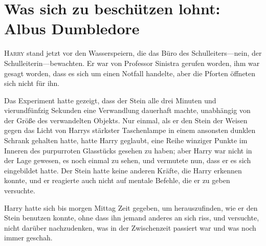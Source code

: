\chapter{Was sich zu beschützen lohnt: Albus Dumbledore}

\lettrine{H}{arry} stand jetzt vor den Wasserspeiern, die das Büro des Schulleiters—nein, der Schulleiterin—bewachten. Er war von Professor Sinistra gerufen worden, ihm war gesagt worden, dass es sich um einen Notfall handelte, aber die Pforten öffneten sich nicht für ihn.

Das Experiment hatte gezeigt, dass der Stein alle drei Minuten und vierundfünfzig Sekunden eine Verwandlung dauerhaft machte, unabhängig von der Größe des verwandelten Objekts. Nur einmal, als er den Stein der Weisen gegen das Licht von Harrys stärkster Taschenlampe in einem ansonsten dunklen Schrank gehalten hatte, hatte Harry geglaubt, eine Reihe winziger Punkte im Inneren des purpurroten Glasstücks gesehen zu haben; aber Harry war nicht in der Lage gewesen, es noch einmal zu sehen, und vermutete nun, dass er es sich eingebildet hatte. Der Stein hatte keine anderen Kräfte, die Harry erkennen konnte, und er reagierte auch nicht auf mentale Befehle, die er zu geben versuchte.

Harry hatte sich bis morgen Mittag Zeit gegeben, um herauszufinden, wie er den Stein benutzen konnte, ohne dass ihn jemand anderes an sich riss, und versuchte, nicht darüber nachzudenken, was in der Zwischenzeit passiert war und was noch immer geschah.

